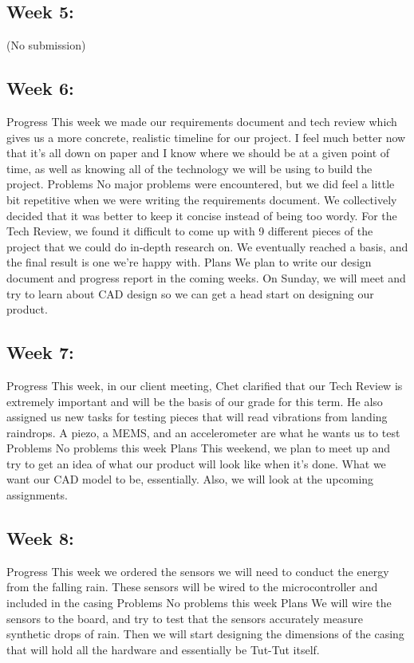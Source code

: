 \documentclass[letterpaper,10pt,draftclsnofoot,onecolumn]{article}
\begin{document}
\subsection{Week 5:}

(No submission)

\subsection{Week 6:}

Progress
This week we made our requirements document and tech review which gives us a more concrete, realistic timeline for our project. I feel much better now that it's all down on paper and I know where we should be at a given point of time, as well as knowing all of the technology we will be using to build the project.
\newline
Problems
No major problems were encountered, but we did feel a little bit repetitive when we were writing the requirements document. We collectively decided that it was better to keep it concise instead of being too wordy. For the Tech Review, we found it difficult to come up with 9 different pieces of the project that we could do in-depth research on. We eventually reached a basis, and the final result is one we're happy with.
\newline
Plans
We plan to write our design document and progress report in the coming weeks. On Sunday, we will meet and try to learn about CAD design so we can get a head start on designing our product.
\subsection{Week 7:}
Progress
This week, in our client meeting, Chet clarified that our Tech Review is extremely important and will be the basis of our grade for this term.  He also assigned us new tasks for testing pieces that will read vibrations from landing raindrops. A piezo, a MEMS, and an accelerometer are what he wants us to test
\newline
Problems
No problems this week
\newline
Plans
This weekend, we plan to meet up and try to get an idea of what our product will look like when it's done. What we want our CAD model to be, essentially. Also, we will look at the upcoming assignments.
 
\subsection{Week 8:}
Progress
This week we ordered the sensors we will need to conduct the energy from the falling rain. These sensors will be wired to the microcontroller and included in the casing
\newline
Problems
No problems this week
\newline
Plans
We will wire the sensors to the board, and try to test that the sensors accurately measure synthetic drops of rain. Then we will start designing the dimensions of the casing that will hold all the hardware and essentially be Tut-Tut itself.
 
\end{document}
